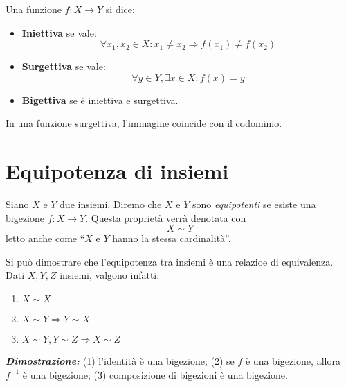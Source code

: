 \begin{tcolorbox}[colback=yellow!30, colframe=yellow!30!black, title={Iniettività, surgettività, bigettività}]
Una funzione $f:X\to Y$ si dice:
\begin{itemize}
    \item \textbf{Iniettiva} se vale: \[ \forall x_1,x_2\in X:x_1 \not= x_2 \Rightarrow f(x_1) \not = f(x_2) \]
    \item \textbf{Surgettiva} se vale: \[ \forall y\in Y, \exists x\in X: f(x) = y \]
    \item \textbf{Bigettiva} se è iniettiva e surgettiva.
\end{itemize}
\end{tcolorbox}

\begin{osservaz}
In una funzione surgettiva, l'immagine coincide con il codominio.
\end{osservaz}




\section{Equipotenza di insiemi}
\begin{tcolorbox}[enhanced, breakable, colback=yellow!30, colframe=yellow!30!black, title={Composizione}]
Siano $X$ e $Y$ due insiemi. Diremo che $X$ e $Y$ sono \textit{equipotenti}
se esiste una bigezione $f:X\to Y$. Questa proprietà verrà denotata con
\[ X\sim Y \]
letto anche come ``$X$ e $Y$ hanno la stessa cardinalità''.
\end{tcolorbox}

Si può dimostrare che l'equipotenza tra insiemi è una relazioe di equivalenza.
Dati $X,Y,Z$ insiemi, valgono infatti:
\begin{enumerate}
    \item $X\sim X$
    \item $X\sim Y \Rightarrow Y \sim X$
    \item $X\sim Y, Y\sim Z \Rightarrow X \sim Z$
\end{enumerate}
\textbf{\textit{Dimostrazione:}} (1) l'identità è una bigezione; (2)
se $f$ è una bigezione, allora $f^{-1}$ è una bigezione; (3) composizione
di bigezioni è una bigezione.
\cvd

